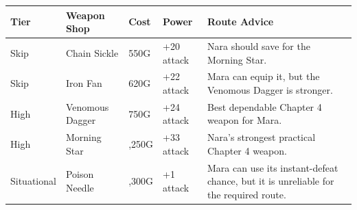 \documentclass[
  american,
  10pt,
  letterpaper,
  oneside,
  open=any]{scrreprt}
\newcounter{none} %
\newenvironment{guidetable}{%
  \small\setstretch{1.0}%
  \setlength{\tabcolsep}{4pt}%
  \setlength{\LTpre}{8pt}\setlength{\LTpost}{10pt}%
  \renewcommand{\arraystretch}{1.16}%
}{ }
\begin{document}
\begin{guidetable}

{\def\LTcaptype{none} %
\begin{longtable}[]{@{}
  >{\raggedright\arraybackslash}p{}
  >{\raggedright\arraybackslash}p{}
  >{\raggedleft\arraybackslash}p{}
  >{\raggedleft\arraybackslash}p{}
  >{\raggedright\arraybackslash}p{}@{}}
\toprule\noalign{}
\begin{minipage}[b]{\linewidth}\raggedright
\color{GuideGreen}\bfseries Tier
\end{minipage} & \begin{minipage}[b]{\linewidth}\raggedright
\color{GuideGreen}\bfseries Weapon Shop
\end{minipage} & \begin{minipage}[b]{\linewidth}\raggedleft
\color{GuideGreen}\bfseries Cost
\end{minipage} & \begin{minipage}[b]{\linewidth}\raggedleft
\color{GuideGreen}\bfseries Power
\end{minipage} & \begin{minipage}[b]{\linewidth}\raggedright
\color{GuideGreen}\bfseries Route Advice
\end{minipage} \\
\midrule\noalign{}
\endhead
\bottomrule\noalign{}
\endlastfoot
Skip & Chain Sickle & 550G & +20 attack & Nara should save for the
Morning Star. \\
Skip & Iron Fan & 620G & +22 attack & Mara can equip it, but the
Venomous Dagger is stronger. \\
High & Venomous Dagger & 750G & +24 attack & Best dependable Chapter 4
weapon for Mara. \\
High & Morning Star & 1,250G & +33 attack & Nara's strongest practical
Chapter 4 weapon. \\
Situational & Poison Needle & 1,300G & +1 attack & Mara can use its
instant-defeat chance, but it is unreliable for the required route. \\
\end{longtable}
}

\end{guidetable}
\end{document}
